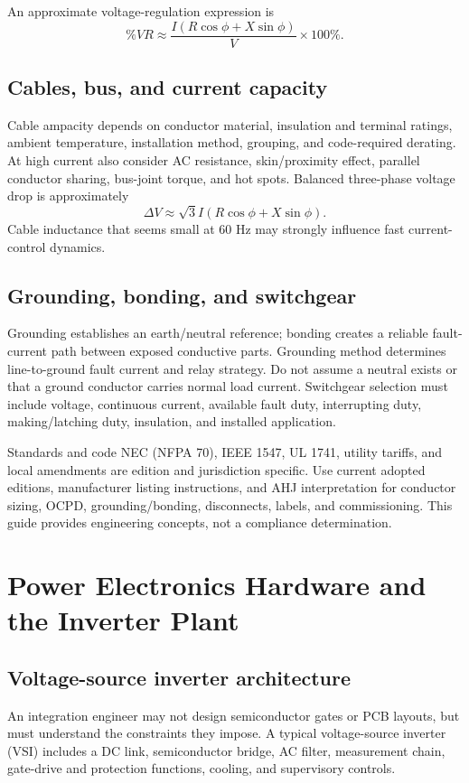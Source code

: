 \documentclass[11pt]{article}
\begin{document}
An approximate voltage-regulation expression is
\[
\%VR\approx\frac{I(R\cos\phi+X\sin\phi)}{V}\times100\%.
\]

\subsection{Cables, bus, and current capacity}
Cable ampacity depends on conductor material, insulation and terminal ratings,
ambient temperature, installation method, grouping, and code-required derating.
At high current also consider AC resistance, skin/proximity effect, parallel
conductor sharing, bus-joint torque, and hot spots. Balanced three-phase voltage
drop is approximately
\[
\Delta V\approx\sqrt3I(R\cos\phi+X\sin\phi).
\]
Cable inductance that seems small at 60 Hz may strongly influence fast
current-control dynamics.

\subsection{Grounding, bonding, and switchgear}
Grounding establishes an earth/neutral reference; bonding creates a reliable
fault-current path between exposed conductive parts. Grounding method determines
line-to-ground fault current and relay strategy. Do not assume a neutral exists
or that a ground conductor carries normal load current. Switchgear selection
must include voltage, continuous current, available fault duty, interrupting
duty, making/latching duty, insulation, and installed application.

\begin{warningbox}{Standards and code}
NEC (NFPA 70), IEEE 1547, UL 1741, utility tariffs, and local amendments are
edition and jurisdiction specific. Use current adopted editions, manufacturer
listing instructions, and AHJ interpretation for conductor sizing, OCPD,
grounding/bonding, disconnects, labels, and commissioning. This guide provides
engineering concepts, not a compliance determination.
\end{warningbox}

\section{Power Electronics Hardware and the Inverter Plant}

\subsection{Voltage-source inverter architecture}
An integration engineer may not design semiconductor gates or PCB layouts, but
must understand the constraints they impose. A typical voltage-source inverter
(VSI) includes a DC link, semiconductor bridge, AC filter, measurement chain,
gate-drive and protection functions, cooling, and supervisory controls.
\end{document}
